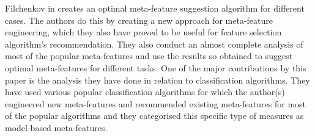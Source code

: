 Filchenkov in \citep{meta-features-2} creates an optimal meta-feature suggestion algorithm for different cases. The authors do this by creating a new approach for meta-feature engineering, which they also have proved to be useful for feature selection algorithm's recommendation. They also conduct an almost complete analysis of most of the popular meta-features and use the results so obtained to suggest optimal meta-features for different tasks. One of the major contributions by this paper is the analysis they have done in relation to classification algorithms. They have used various popular classification algorithms for which the author(s) engineered new meta-features and recommended existing meta-features for most of the popular algorithms and they categorised this specific type of measures as model-based meta-features.

